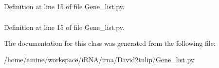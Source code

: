 \-Definition at line 15 of file \-Gene\-\_\-list.\-py.

\hypertarget{classirna_1_1David2tulip_1_1Gene__list_1_1Gene__list_ac076f762cdb8b69bfd4d58a7dd300061}{
\subsubsection[{term\-Name}]{}}
\label{classirna_1_1David2tulip_1_1Gene__list_1_1Gene__list_ac076f762cdb8b69bfd4d58a7dd300061}


\-Definition at line 15 of file \-Gene\-\_\-list.\-py.



\-The documentation for this class was generated from the following file\-:\begin{DoxyCompactItemize}
\item 
/home/amine/workspace/i\-R\-N\-A/irna/\-David2tulip/\hyperlink{Gene__list_8py}{\-Gene\-\_\-list.\-py}\end{DoxyCompactItemize}
